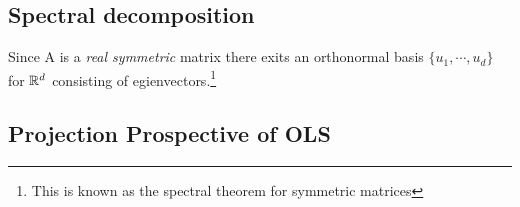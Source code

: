 \subsection{Spectral decomposition}
Since A is a \textit{real symmetric} matrix there exits an orthonormal basis $\{u_1, \cdots, u_d\}$ for $\mathbb R^d$ consisting of egienvectors.\footnote{This is known as the spectral theorem for symmetric matrices}
\subsection{Projection Prospective of OLS}
 